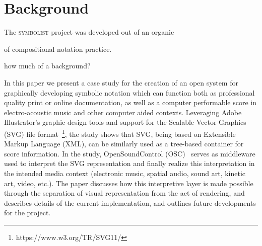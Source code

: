 \documentclass{article}
\title{\papertitle}
\def\symbolist{\textsc{symbolist}\xspace}
\begin{document}
%
\capstartfalse
\maketitle
\capstarttrue


\begin{abstract}

maybe already start with history here, and then continue to symbolist?

  \symbolist is an in-development application for experimental notation, with the goal of creating a working environment for developing symbolic notation for multimedia which can be interpreted and performed by electronics. The program aims to provide an open play space, with tools for experimentation, and thinking visually about relationships between representation and interpretation in media performance. 
In the paper we discuss the evaluation and re-design of the application based on the need for a bi-directional mapping framework for working with symbolic notation and its corresponding data representations.

\end{abstract}



\section{Background}\label{sec:background}

The \symbolist project was developed out of an organic  

of compositional notation practice. 

how much of a background?

In this paper we present a case study for the creation of an open system for graphically developing symbolic notation which can function both as professional quality print or online documentation, as well as a computer performable score in electro-acoustic music and other computer aided contexts. Leveraging Adobe Illustrator’s graphic design tools and support for the Scalable Vector Graphics (SVG) file format~\footnote{https://www.w3.org/TR/SVG11/}, the study shows that SVG, being based on Extensible Markup Language (XML), can be similarly used as a tree-based container for score information. In the study, OpenSoundControl (OSC)~\cite{wright:osc}  serves as middleware used to interpret the SVG representation and finally realize this interpretation in the intended media context (electronic music, spatial audio, sound art, kinetic art, video, etc.). The paper discusses how this interpretive layer is made possible through the separation of visual representation from the act of rendering, and describes details of the current implementation, and outlines future developments for the project.
\end{document}
